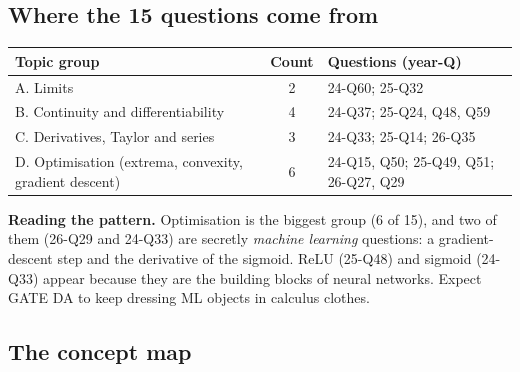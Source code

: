 \documentclass[11pt,a4paper]{article}
\begin{document}
\subsection{Where the 15 questions come from}
\begin{center}
\small
\begin{tabularx}{\textwidth}{>{\raggedright\arraybackslash}p{5.0cm}cX}
\toprule
\textbf{Topic group} & \textbf{Count} & \textbf{Questions (year-Q)}\\\midrule
A. Limits & 2 & 24-Q60; 25-Q32\\
B. Continuity and differentiability & 4 & 24-Q37; 25-Q24, Q48, Q59\\
C. Derivatives, Taylor and series & 3 & 24-Q33; 25-Q14; 26-Q35\\
D. Optimisation (extrema, convexity, gradient descent) & 6 & 24-Q15, Q50; 25-Q49, Q51; 26-Q27, Q29\\
\bottomrule
\end{tabularx}
\end{center}
\textbf{Reading the pattern.} Optimisation is the biggest group (6 of 15), and two of them (26-Q29 and 24-Q33) are secretly \emph{machine learning} questions: a gradient-descent step and the derivative of the sigmoid. ReLU (25-Q48) and sigmoid (24-Q33) appear because they are the building blocks of neural networks. Expect GATE DA to keep dressing ML objects in calculus clothes.

\subsection{The concept map}
\begin{center}
\end{center}
\end{document}
